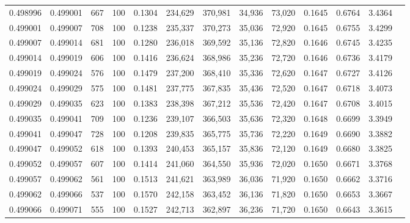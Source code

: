 \begin{tabular}{rrrrrrrrrrrrr}
0.498996 & 0.499001 &   667 & 100 &                                     0.1304 & 234,629 & 370,981 &  34,936 &  73,020 & 0.1645 & 0.6764 & 3.4364 \\
0.499001 & 0.499007 &   708 & 100 &                                     0.1238 & 235,337 & 370,273 &  35,036 &  72,920 & 0.1645 & 0.6755 & 3.4299 \\
0.499007 & 0.499014 &   681 & 100 &                                     0.1280 & 236,018 & 369,592 &  35,136 &  72,820 & 0.1646 & 0.6745 & 3.4235 \\
0.499014 & 0.499019 &   606 & 100 &                                     0.1416 & 236,624 & 368,986 &  35,236 &  72,720 & 0.1646 & 0.6736 & 3.4179 \\
0.499019 & 0.499024 &   576 & 100 &                                     0.1479 & 237,200 & 368,410 &  35,336 &  72,620 & 0.1647 & 0.6727 & 3.4126 \\
0.499024 & 0.499029 &   575 & 100 &                                     0.1481 & 237,775 & 367,835 &  35,436 &  72,520 & 0.1647 & 0.6718 & 3.4073 \\
0.499029 & 0.499035 &   623 & 100 &                                     0.1383 & 238,398 & 367,212 &  35,536 &  72,420 & 0.1647 & 0.6708 & 3.4015 \\
0.499035 & 0.499041 &   709 & 100 &                                     0.1236 & 239,107 & 366,503 &  35,636 &  72,320 & 0.1648 & 0.6699 & 3.3949 \\
0.499041 & 0.499047 &   728 & 100 &                                     0.1208 & 239,835 & 365,775 &  35,736 &  72,220 & 0.1649 & 0.6690 & 3.3882 \\
0.499047 & 0.499052 &   618 & 100 &                                     0.1393 & 240,453 & 365,157 &  35,836 &  72,120 & 0.1649 & 0.6680 & 3.3825 \\
0.499052 & 0.499057 &   607 & 100 &                                     0.1414 & 241,060 & 364,550 &  35,936 &  72,020 & 0.1650 & 0.6671 & 3.3768 \\
0.499057 & 0.499062 &   561 & 100 &                                     0.1513 & 241,621 & 363,989 &  36,036 &  71,920 & 0.1650 & 0.6662 & 3.3716 \\
0.499062 & 0.499066 &   537 & 100 &                                     0.1570 & 242,158 & 363,452 &  36,136 &  71,820 & 0.1650 & 0.6653 & 3.3667 \\
0.499066 & 0.499071 &   555 & 100 &                                     0.1527 & 242,713 & 362,897 &  36,236 &  71,720 & 0.1650 & 0.6643 & 3.3615 \\

\end{tabular}
